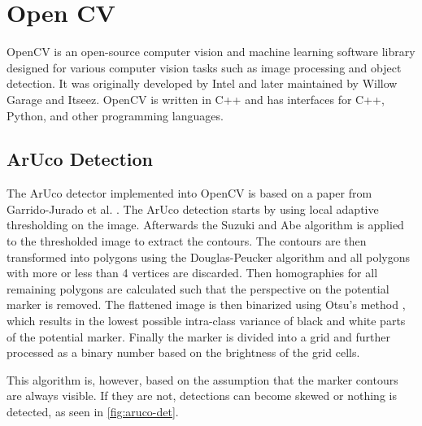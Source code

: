 \documentclass[10pt]{book}
\newcommand{\figureref}[1]{\autoref{#1}}
\begin{document}
\section{Open CV}

\ac{OpenCV} is an open-source computer vision and machine learning software library designed for various computer vision tasks such as image processing and object detection. It was originally developed by Intel and later maintained by Willow Garage and Itseez. \ac{OpenCV} is written in C++ and has interfaces for C++, Python, and other programming languages.

\subsection{ArUco Detection}
\label{sec:aruco_det}

The \ac{ArUco} detector implemented into \ac{OpenCV} is based on a paper from Garrido-Jurado et al. \cite{garrido2014automatic}. The \ac{ArUco} detection starts by using local adaptive thresholding on the image. Afterwards the Suzuki
and Abe algorithm \cite{SUZUKI198532} is applied to the thresholded image to extract the contours. The contours are then transformed into polygons using the Douglas-Peucker algorithm \cite{douglas1973algorithms} and all polygons with more or less than 4 vertices are discarded. Then homographies for all remaining polygons are calculated such that the perspective on the potential marker is removed. The flattened image is then binarized using Otsu's method \cite{4310076}, which results in the lowest possible intra-class variance of black and white parts of the potential marker. Finally the marker is divided into a grid and further processed as a binary number based on the brightness of the grid cells.

This algorithm is, however, based on the assumption that the marker contours are always visible. If they are not, detections can become skewed or nothing is detected, as seen in \figureref{fig:aruco-det}.
\end{document}
